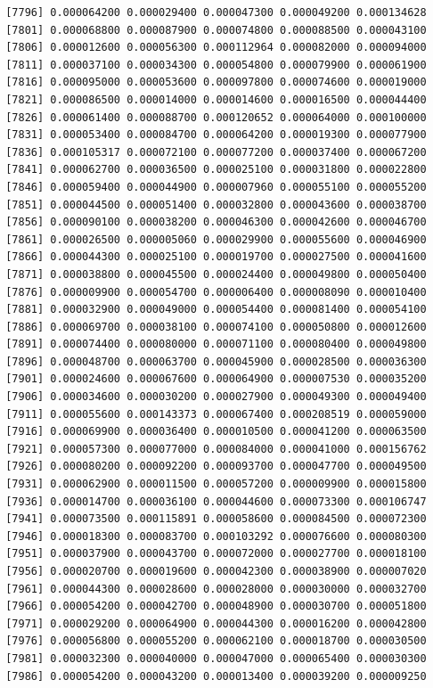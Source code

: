 \documentclass[]{article}
\begin{document}
\begin{verbatim}
 [7796] 0.000064200 0.000029400 0.000047300 0.000049200 0.000134628
 [7801] 0.000068800 0.000087900 0.000074800 0.000088500 0.000043100
 [7806] 0.000012600 0.000056300 0.000112964 0.000082000 0.000094000
 [7811] 0.000037100 0.000034300 0.000054800 0.000079900 0.000061900
 [7816] 0.000095000 0.000053600 0.000097800 0.000074600 0.000019000
 [7821] 0.000086500 0.000014000 0.000014600 0.000016500 0.000044400
 [7826] 0.000061400 0.000088700 0.000120652 0.000064000 0.000100000
 [7831] 0.000053400 0.000084700 0.000064200 0.000019300 0.000077900
 [7836] 0.000105317 0.000072100 0.000077200 0.000037400 0.000067200
 [7841] 0.000062700 0.000036500 0.000025100 0.000031800 0.000022800
 [7846] 0.000059400 0.000044900 0.000007960 0.000055100 0.000055200
 [7851] 0.000044500 0.000051400 0.000032800 0.000043600 0.000038700
 [7856] 0.000090100 0.000038200 0.000046300 0.000042600 0.000046700
 [7861] 0.000026500 0.000005060 0.000029900 0.000055600 0.000046900
 [7866] 0.000044300 0.000025100 0.000019700 0.000027500 0.000041600
 [7871] 0.000038800 0.000045500 0.000024400 0.000049800 0.000050400
 [7876] 0.000009900 0.000054700 0.000006400 0.000008090 0.000010400
 [7881] 0.000032900 0.000049000 0.000054400 0.000081400 0.000054100
 [7886] 0.000069700 0.000038100 0.000074100 0.000050800 0.000012600
 [7891] 0.000074400 0.000080000 0.000071100 0.000080400 0.000049800
 [7896] 0.000048700 0.000063700 0.000045900 0.000028500 0.000036300
 [7901] 0.000024600 0.000067600 0.000064900 0.000007530 0.000035200
 [7906] 0.000034600 0.000030200 0.000027900 0.000049300 0.000049400
 [7911] 0.000055600 0.000143373 0.000067400 0.000208519 0.000059000
 [7916] 0.000069900 0.000036400 0.000010500 0.000041200 0.000063500
 [7921] 0.000057300 0.000077000 0.000084000 0.000041000 0.000156762
 [7926] 0.000080200 0.000092200 0.000093700 0.000047700 0.000049500
 [7931] 0.000062900 0.000011500 0.000057200 0.000009900 0.000015800
 [7936] 0.000014700 0.000036100 0.000044600 0.000073300 0.000106747
 [7941] 0.000073500 0.000115891 0.000058600 0.000084500 0.000072300
 [7946] 0.000018300 0.000083700 0.000103292 0.000076600 0.000080300
 [7951] 0.000037900 0.000043700 0.000072000 0.000027700 0.000018100
 [7956] 0.000020700 0.000019600 0.000042300 0.000038900 0.000007020
 [7961] 0.000044300 0.000028600 0.000028000 0.000030000 0.000032700
 [7966] 0.000054200 0.000042700 0.000048900 0.000030700 0.000051800
 [7971] 0.000029200 0.000064900 0.000044300 0.000016200 0.000042800
 [7976] 0.000056800 0.000055200 0.000062100 0.000018700 0.000030500
 [7981] 0.000032300 0.000040000 0.000047000 0.000065400 0.000030300
 [7986] 0.000054200 0.000043200 0.000013400 0.000039200 0.000009250

\end{verbatim}
\end{document}
